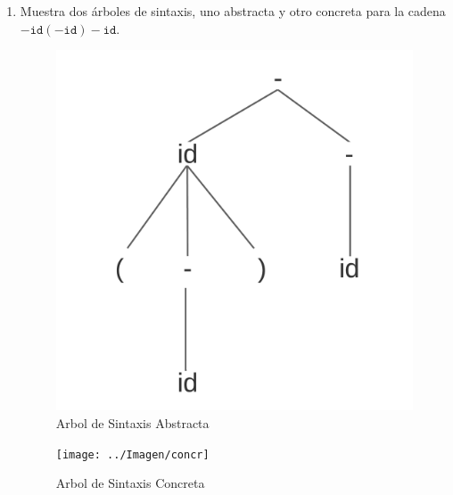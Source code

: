 \begin{enumerate}
    \item Muestra dos \'arboles de sintaxis, uno abstracta y otro
    concreta para la cadena
    $-\mathtt{id}(-\mathtt{id})-\mathtt{id}$.

        \begin{figure}[h]
            \centering
            \includegraphics[scale = 0.5]{../Imagen/abst}
            \caption{Arbol de Sintaxis Abstracta}
            \label{fig:abst}
        \end{figure}

        \begin{figure}[h]
            \centering
            \texttt{[image: ../Imagen/concr]}
            \caption{Arbol de Sintaxis Concreta}
            \label{fig:concr}
        \end{figure}


\end{enumerate}